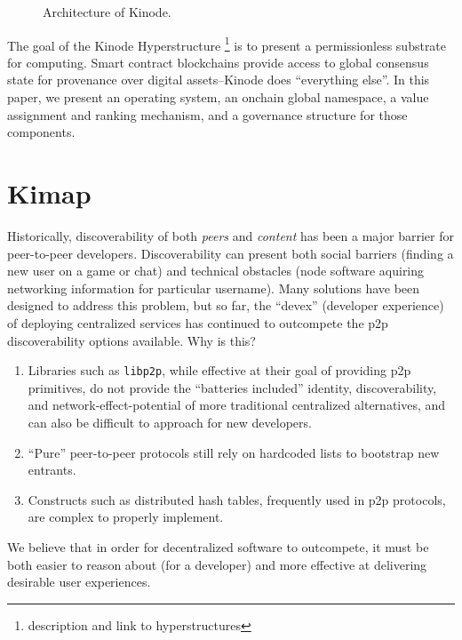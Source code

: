 \documentclass[runningheads]{llncs}
\begin{document}
\begin{figure}[H]
    \centering
    \caption{Architecture of Kinode.}
    \label{fig:triangle}
\end{figure}

The goal of the Kinode Hyperstructure
\footnote{description and link to hyperstructures}
is to present a permissionless substrate for computing.
Smart contract blockchains provide access to global consensus state for provenance over digital assets–Kinode does ``everything else''.
In this paper, we present an operating system, an onchain global namespace, a value assignment and ranking mechanism, and a governance structure for those components.

\section{Kimap}
\label{sec:kimap}

Historically, discoverability of both \textit{peers} and \textit{content} has been a major barrier for peer-to-peer developers.
Discoverability can present both social barriers (finding a new user on a game or chat) and technical obstacles (node software aquiring networking information for particular username).
Many solutions have been designed to address this problem, but so far, the ``devex'' (developer experience) of deploying centralized services has continued to outcompete the p2p discoverability options available.
Why is this?
\begin{enumerate}
    \item Libraries such as \verb|libp2p|, while effective at their goal of providing p2p primitives, do not provide the ``batteries included'' identity, discoverability, and network-effect-potential of more traditional centralized alternatives, and can also be difficult to approach for new developers.
    \item ``Pure'' peer-to-peer protocols still rely on hardcoded lists to bootstrap new entrants.
    \item Constructs such as distributed hash tables, frequently used in p2p protocols, are complex to properly implement.
\end{enumerate}
We believe that in order for decentralized software to outcompete, it must be both easier to reason about (for a developer) and more effective at delivering desirable user experiences.
\end{document}

